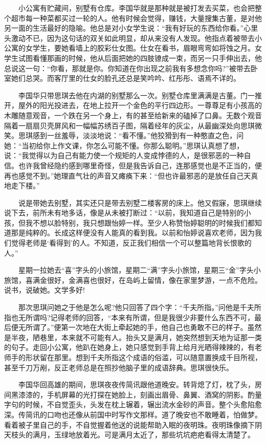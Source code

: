 \documentclass[12pt,UTF8]{ctexbook}
\begin{document}
　　小公寓有贮藏间，别墅有仓库。李国华就是那种就是被打发去买菜，也会把整个超市每一种菜都买过一轮的人。他有时候会觉得，赚钱，大量搜集古董，是对他另一面的生活最好的隐喻。他总是对小女学生说：\enquote{我有好玩的东西给你看。}心里头激动不已，因为这句话的双关如此明显，却从来没有人发现。他指点着被带去小公寓的女学生，要她看墙上的胶彩仕女图。仕女在看书，眉眼弯弯如将蚀之月。女学生试图看懂那画的时候，他从后面把她的四肢镣成一束，而另一只手伸出去，他总说这一句：\enquote{你看，那就是你。你知道在你出现之前我有多想念你吗?}被带去卧室她们总哭。而客厅里的仕女的脸孔还总是笑吟吟、红彤彤、语焉不详的。

　　李国华只带思琪去他在内湖的别墅那么一次。别墅仓库里满满是古董。门一推开，屋外的阳光投进去，在地上拉开一个金色的平行四边形。一尊尊足有小孩高的木雕随意观音，一个跌在另一个身上，有的甚至给新来的磕掉了口鼻。无数个观音隔着一扇扇贝壳屏风和一幅幅苏绣百子图，隔着经年的灰尘，从最幽深处向思琪微笑。思琪感到一丝羞辱，淡淡地说：\enquote{看不懂。}他狡猾到有一种憨直之色，问她：\enquote{当初给你上作文课，你怎么可能不懂。你那么聪明。}思琪认真想了想，说：\enquote{我觉得以为自己有能力使一个规矩的人变成悖德的人，是很邪恶的一种自信。也许我曾经隐约感到哪里奇怪，但是我告诉自己，连那感觉也是不正当的，便再也感觉不到。}她理直气壮的声音又瘫痪下来：\enquote{但也许最邪恶的是放任自己天真地走下楼。}

　　说是带她去别墅，其实还只是带去别墅二楼客房的床上。他又假寐，思琪继续说下去，前所未有地多话，像是从未被打断过：\enquote{以前，我知道自己是特别的小孩，但我不想以脸特别，我只想跟怡婷一样。至少人称赞怡婷聪明的时候我们都知道那是纯粹的。长成这样便没有人能真的看到我。以前和怡婷说喜欢老师，因为我们觉得老师是`看得到'的人。不知道，反正我们相信一个可以整篇地背长恨歌的人。}

　　星期一拉她去\enquote{喜}字头的小旅馆，星期二\enquote{满}字头小旅馆，星期三\enquote{金}字头小旅馆，喜满金很好，金满喜也很好，在岛屿上留情，像在家里梦游，一点不危险。说书，说破她。文学多好!

　　那次思琪问她之于他是怎么呢?他只回答了四个字：\enquote{千夫所指。}问他是千夫所指也无所谓吗?记得老师的回答，\enquote{本来有所谓，但是我很少非要什么东西不可，最后便无所谓了。}便第一次地在大街上牵起她的手，他自己也勇敢不已的样子。虽然是半夜，陋巷里，本来就不可能有人。抬头又是满月，她突然想到天地为证那一类的句子。走回小公寓，他趴在她身上，她只感觉到手背上给月光晒得辣辣的，有老师手的形状留在那里。想到千夫所指这个成语的俗滥，可以随意置换成千目所视，甚至千刀万剐，反正老师总是在照抄他脑子里的成语辞典。思琪很快乐。

　　李国华回高雄的期间，思琪夜夜传简讯跟他道晚安。转背熄了灯，枕了头，房间黑漆漆的，手机屏幕的光打探在她脸上，刻画出眉骨、鼻翼、酒窝的阴影。酌量字句的时候，不自觉歪头，头发在枕上辗着，辗出流水金砂的声音。整个头愈陷愈深。传简讯的口吻也还像从前国中时写作文那样。道了晚安也不敢睡着，怕做梦。看着被子里自己的手，不自觉握着他送的说能帮助入眠的夜明珠。夜明珠像摘下阴天枝头的满月，玉绿地放着光。可是满月太近了，那些坑坑疤疤看得太清楚了。
\end{document}
